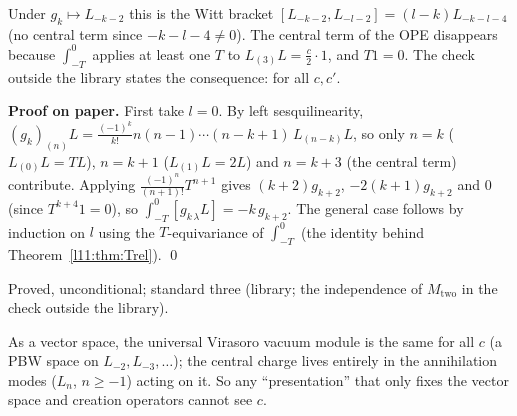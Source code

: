 \begin{dictionary}
Under $g_k\mapsto L_{-k-2}$ this is the Witt bracket $[L_{-k-2},L_{-l-2}] = (l-k)L_{-k-l-4}$ (no central term since
$-k-l-4\neq0$). The central term of the OPE disappears because $\int_{-T}^0$ applies at least one $T$ to $L_{(3)}L = \frac c2\cdot1$,
and $T1 = 0$. The check outside the library states the consequence:  for all $c,c'$.
\end{dictionary}

\textbf{Proof on paper.} First take $l=0$. By left sesquilinearity, $(g_k)_{(n)}L = \frac{(-1)^k}{k!}n(n-1)\cdots(n-k+1)\,L_{(n-k)}L$,
so only $n = k$ ($L_{(0)}L = TL$), $n = k+1$ ($L_{(1)}L = 2L$) and $n = k+3$ (the central term) contribute. Applying
$\frac{(-1)^n}{(n+1)!}T^{n+1}$ gives $(k+2)g_{k+2}$, $-2(k+1)g_{k+2}$ and $0$ (since $T^{k+4}1 = 0$), so
$\int_{-T}^0[g_{k\,\lambda}L] = -k\,g_{k+2}$. The general case follows by induction on $l$ using the $T$-equivariance of
$\int_{-T}^0$ (the identity behind Theorem~\ref{l11:thm:Trel}). \qed

\begin{status}
Proved, unconditional; standard three (library; the independence of $M_{\mathrm{two}}$ in the check
outside the library).
\end{status}

\begin{physics}
As a vector space, the universal Virasoro vacuum module is the same for all $c$ (a PBW space on $L_{-2},L_{-3},\dots$); the central
charge lives entirely in the annihilation modes ($L_{n}$, $n\ge-1$) acting on it. So any ``presentation'' that only fixes the vector
space and creation operators cannot see $c$.
\end{physics}

